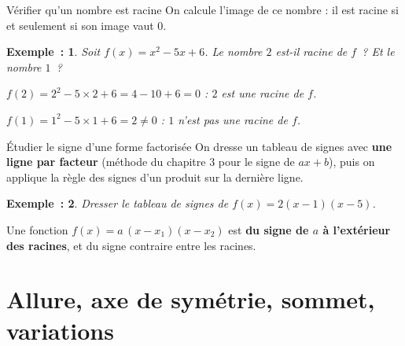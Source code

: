 \documentclass[12pt]{article}
\theoremstyle{break}
\newtheorem*{example}{Exemple~:}
\theoremstyle{inline}
\begin{document}
\begin{method}{Vérifier qu'un nombre est racine}{}
  On calcule l'image de ce nombre : il est racine si et seulement si son image vaut $0$.
\end{method}

\begin{example}
  Soit $f(x) = x^2 - 5x + 6$. Le nombre $2$ est-il racine de $f$~? Et le nombre $1$~?
  \begin{multihideW}[0.5em]
    $f(2) = 2^2 - 5 \times 2 + 6 = 4 - 10 + 6 = 0$ : $2$ est une racine de $f$.

    $f(1) = 1^2 - 5 \times 1 + 6 = 2 \neq 0$ : $1$ n'est pas une racine de $f$.
  \end{multihideW}
\end{example}

\newpage
\begin{method}{Étudier le signe d'une forme factorisée}{}
  On dresse un tableau de signes avec \textbf{une ligne par facteur} (méthode du chapitre 3 pour le signe de $ax + b$), puis on applique la règle des signes d'un produit sur la dernière ligne.
\end{method}

\begin{example}
  Dresser le tableau de signes de $f(x) = 2(x - 1)(x - 5)$.

  \begin{center}
  \end{center}
\end{example}

\begin{proposition}{}{}
  \begin{multihide}
    Une fonction $f(x) = a\,(x - x_1)(x - x_2)$ est \textbf{du signe de $a$ à l'extérieur des racines}, et du signe contraire entre les racines.
  \end{multihide}
\end{proposition}

\newpage
\section{Allure, axe de symétrie, sommet, variations}
\end{document}
